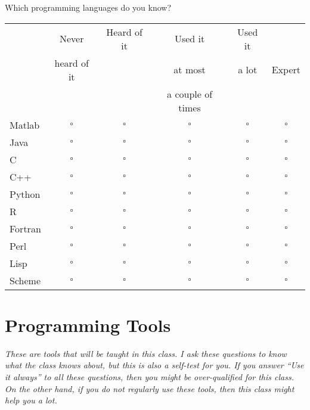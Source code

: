 \documentclass[article,twoside]{memoir}
\newcommand*{\checkbox}{$\square$}
\newcommand{\header}[1]{\textsl{#1}\par\medskip}
\def\th#1{#1}
\begin{document}
Which programming languages do you know?

\begin{tabular}{lccccc}
 \toprule
 & \th{Never}       & \th{Heard of it} & \th{Used it}           & \th{Used it} & \th{}\\
 & \th{heard of it} & \th{}            & \th{at most}           & \th{a lot}   & \th{Expert}\\
 & \th{}            & \th{}            & \th{a couple of times} & \th{}        & \th{}\\
 \midrule
Matlab  &\checkbox &\checkbox &\checkbox &\checkbox &\checkbox \\
Java    &\checkbox &\checkbox &\checkbox &\checkbox &\checkbox \\
C       &\checkbox &\checkbox &\checkbox &\checkbox &\checkbox \\
C++     &\checkbox &\checkbox &\checkbox &\checkbox &\checkbox \\
Python  &\checkbox &\checkbox &\checkbox &\checkbox &\checkbox \\
R       &\checkbox &\checkbox &\checkbox &\checkbox &\checkbox \\
Fortran &\checkbox &\checkbox &\checkbox &\checkbox &\checkbox \\
Perl    &\checkbox &\checkbox &\checkbox &\checkbox &\checkbox \\
Lisp    &\checkbox &\checkbox &\checkbox &\checkbox &\checkbox \\
Scheme  &\checkbox &\checkbox &\checkbox &\checkbox &\checkbox \\
\end{tabular}

\section{Programming Tools}
\header{These are tools that will be taught in this class. I ask these questions to know what the class knows about, but this is also a self-test for you. If you answer ``Use it always'' to all these questions, then you might be over-qualified for this class.  On the other hand, if you do not regularly use these tools, then this class might help you a lot.}
\end{document}
